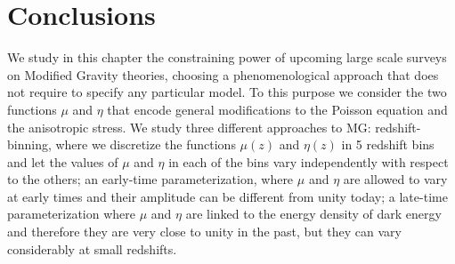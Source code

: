 \section{Conclusions}



We study in this chapter the constraining power of upcoming large scale surveys on Modified Gravity theories, choosing a phenomenological approach that does not require to specify any particular model. To this purpose we consider the two functions $\mu$ and $\eta$ that encode general modifications to the Poisson equation and the anisotropic stress.
We study three different approaches to MG: redshift-binning, where we discretize the functions $\mu(z)$ and $\eta(z)$ in 5 redshift bins and 
let the values of $\mu$ and $\eta$ in each of the bins vary independently with respect to the others; an early-time parameterization, where $\mu$ and $\eta$ are allowed to vary at early times and their amplitude
can be different from unity today; a late-time parameterization where  $\mu$ and $\eta$ are linked to the energy density of dark energy and therefore they are very
close to unity in the past, but they can vary considerably at small redshifts.

